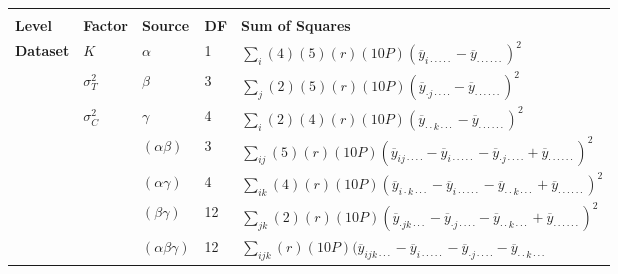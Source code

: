 \begin{table}[h]
\centering\tiny
\begin{tabular}{lllll}\hline\hline\\
\bf Level & \bf Factor & \bf Source & \bf DF & \bf Sum of Squares \\\hline
\multirow{11}{*}{\bf Dataset}
      & $K$    & $\alpha$  & 1 & 
      $\sum_i (4)(5)(r)(10P)(\overline{y}_{i\cdot\cdot\cdot\cdot\cdot}-
                               \overline{y}_{\cdot\cdot\cdot\cdot\cdot\cdot})^2$ \\
      & $\sigma^2_T$ & $\beta$  & 3 & 
      $\sum_j (2)(5)(r)(10P)(\overline{y}_{\cdot j\cdot\cdot\cdot\cdot}-
                               \overline{y}_{\cdot\cdot\cdot\cdot\cdot\cdot})^2$ \\
      & $\sigma^2_C$ & $\gamma$  & 4 & 
      $\sum_i (2)(4)(r)(10P)(\overline{y}_{\cdot\cdot k\cdot\cdot\cdot}-
                               \overline{y}_{\cdot\cdot\cdot\cdot\cdot\cdot})^2$ \\
      \cline{2-5}
      &    & $(\alpha\beta)$ & 3 & 
      $\sum_{ij} (5)(r)(10P)(\overline{y}_{ij\cdot\cdot\cdot\cdot}-
                               \overline{y}_{i\cdot\cdot\cdot\cdot\cdot} - 
                               \overline{y}_{\cdot j\cdot\cdot\cdot\cdot} + 
                               \overline{y}_{\cdot\cdot\cdot\cdot\cdot\cdot})^2$ \\
      &    & $(\alpha\gamma)$ & 4 & 
      $\sum_{ik} (4)(r)(10P)(\overline{y}_{i\cdot k\cdot\cdot\cdot}-
                               \overline{y}_{i\cdot\cdot\cdot\cdot\cdot} - 
                               \overline{y}_{\cdot\cdot k\cdot\cdot\cdot} + 
                               \overline{y}_{\cdot\cdot\cdot\cdot\cdot\cdot})^2$ \\
      &    & $(\beta\gamma)$ & 12 & 
      $\sum_{jk} (2)(r)(10P)(\overline{y}_{\cdot jk\cdot\cdot\cdot}-
                               \overline{y}_{\cdot j\cdot\cdot\cdot\cdot} - 
                               \overline{y}_{\cdot\cdot k\cdot\cdot\cdot} + 
                               \overline{y}_{\cdot\cdot\cdot\cdot\cdot\cdot})^2$ \\
      \cline{2-5}
      &    & \multirow{2}{*}{$(\alpha\beta\gamma)$} & \multirow{2}{*}{12} & 
      $\sum_{ijk} (r)(10P)(\overline{y}_{ijk\cdot\cdot\cdot}-
                             \overline{y}_{i\cdot\cdot\cdot\cdot\cdot} -
                             \overline{y}_{\cdot j\cdot\cdot\cdot\cdot} - 
                             \overline{y}_{\cdot\cdot k\cdot\cdot\cdot} $\\

\end{tabular}
\end{table}
